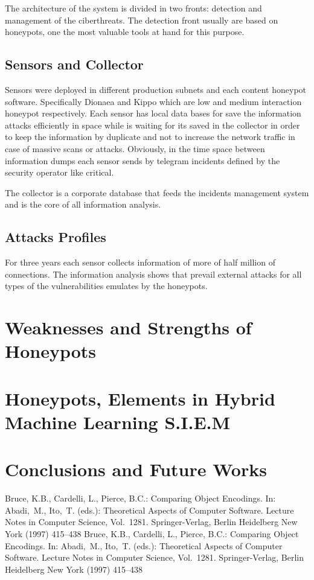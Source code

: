 \documentclass[a4paper]{llncs}
\begin{document}
The architecture of the system is divided in two fronts: detection and management of the ciberthreats. The detection front usually are based on honeypots, one the most valuable tools at hand for this purpose.

\subsection{Sensors and Collector}

Sensors were deployed in different production subnets and each content honeypot software. Specifically Dionaea\cite{dionaea} and Kippo\cite{kippo} which are low and medium interaction honeypot respectively. Each sensor has local data bases for save the information attacks efficiently in space while is waiting for its saved in the collector in order to keep the information by duplicate and not to increase the network traffic in case of massive scans or attacks. Obviously, in the time space between information dumps each sensor sends by telegram incidents defined by the security operator like critical.

The collector is a corporate database that feeds the incidents management system and is the core of all information analysis.


\subsection{Attacks Profiles}

For three years each sensor collects information of more of half million of connections. The information analysis shows that prevail external attacks for all types of the vulnerabilities emulates by the honeypots.


\section{Weaknesses and Strengths of Honeypots}

\section{Honeypots, Elements in Hybrid Machine Learning S.I.E.M}

\section{Conclusions and Future Works}

\begin{thebibliography}{2}
%
Bruce, K.B., Cardelli, L., Pierce, B.C.:
Comparing Object Encodings.
In: Abadi,~M., Ito,~T. (eds.):
Theoretical Aspects of Computer Software.
Lecture Notes in Computer Science, Vol.~1281.
Springer-Verlag, Berlin Heidelberg New York (1997) 415--438
%
Bruce, K.B., Cardelli, L., Pierce, B.C.:
Comparing Object Encodings.
In: Abadi,~M., Ito,~T. (eds.):
Theoretical Aspects of Computer Software.
Lecture Notes in Computer Science, Vol.~1281.
Springer-Verlag, Berlin Heidelberg New York (1997) 415--438
%
\end{thebibliography}
\end{document}
